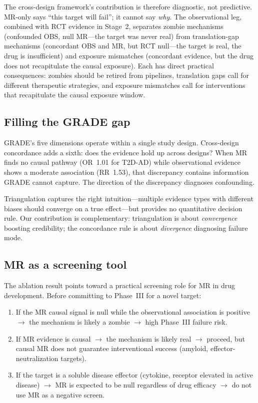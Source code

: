 \documentclass[11pt]{article}
\begin{document}
The cross-design framework's contribution is therefore diagnostic, not predictive. MR-only says ``this target will fail''; it cannot say \emph{why}. The observational leg, combined with RCT evidence in Stage~2, separates zombie mechanisms (confounded OBS, null MR---the target was never real) from translation-gap mechanisms (concordant OBS and MR, but RCT null---the target is real, the drug is insufficient) and exposure mismatches (concordant evidence, but the drug does not recapitulate the causal exposure). Each has direct practical consequences: zombies should be retired from pipelines, translation gaps call for different therapeutic strategies, and exposure mismatches call for interventions that recapitulate the causal exposure window.

\subsection{Filling the GRADE gap}

GRADE's five dimensions operate within a single study design. Cross-design concordance adds a sixth: does the evidence hold up across designs? When MR finds no causal pathway (OR~1.01 for T2D-AD) while observational evidence shows a moderate association (RR~1.53), that discrepancy contains information GRADE cannot capture. The direction of the discrepancy diagnoses confounding.

Triangulation \citep{lawlor2016} captures the right intuition---multiple evidence types with different biases should converge on a true effect---but provides no quantitative decision rule. Our contribution is complementary: triangulation is about \emph{convergence} boosting credibility; the concordance rule is about \emph{divergence} diagnosing failure mode.

\subsection{MR as a screening tool}

The ablation result points toward a practical screening role for MR in drug development. Before committing to Phase~III for a novel target:

\begin{enumerate}
\item If the MR causal signal is null while the observational association is positive $\to$ the mechanism is likely a zombie $\to$ high Phase~III failure risk.
\item If MR evidence is causal $\to$ the mechanism is likely real $\to$ proceed, but causal MR does not guarantee interventional success (amyloid, effector-neutralization targets).
\item If the target is a soluble disease effector (cytokine, receptor elevated in active disease) $\to$ MR is expected to be null regardless of drug efficacy $\to$ do not use MR as a negative screen.
\end{enumerate}
\end{document}
